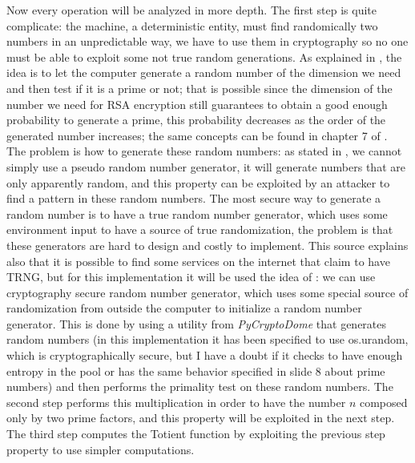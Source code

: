 \documentclass{article}
\begin{document}
Now every operation will be analyzed in more depth.\newline
The first step is quite complicate: the machine, a deterministic entity, must find randomically two numbers in an unpredictable way, we have to use them in cryptography so no one must be able to exploit some not true random generations. As explained in \cite{primeNum}, the idea is to let the computer generate a random number of the dimension we need and then test if it is a prime or not; that is possible since the dimension of the number we need for RSA encryption still guarantees to obtain a good enough probability to generate a prime, this probability decreases as the order of the generated number increases; the same concepts can be found in chapter 7 of \cite{10.5555/1721909}. The problem is how to generate these random numbers: as stated in \cite{TRNG}, we cannot simply use a pseudo random number generator, it will generate numbers that are only apparently random, and this property can be exploited by an attacker to find a pattern in these random numbers. The most secure way to generate a random number is to have a true random number generator, which uses some environment input to have a source of true randomization, the problem is that these generators are hard to design and costly to implement. This source \cite{TRNG} explains also that it is possible to find some services on the internet that claim to have TRNG, but for this implementation it will be used the idea of \cite{pyrandom}: we can use cryptography secure random number generator, which uses some special source of randomization from outside the computer to initialize a random number generator. This is done by using a utility from \textit{PyCryptoDome} that generates random numbers (in this implementation it has been specified to use os.urandom, which is cryptographically secure, but I have a doubt if it checks to have enough entropy in the pool or has the same behavior specified in slide 8 about prime numbers) and then performs the primality test on these random numbers. \newline
The second step performs this multiplication in order to have the number $n$ composed only by two prime factors, and this property will be exploited in the next step. \newline
The third step computes the Totient function by exploiting the previous step property to use simpler computations. \newline
\end{document}
